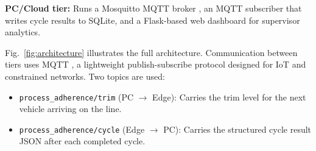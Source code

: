 \documentclass[conference]{IEEEtran}
\begin{document}
\textbf{PC/Cloud tier:} Runs a Mosquitto MQTT broker \cite{b2}, an MQTT subscriber that writes cycle results to SQLite, and a Flask-based \cite{b5} web dashboard for supervisor analytics.

Fig.~\ref{fig:architecture} illustrates the full architecture. Communication between tiers uses MQTT \cite{b7}, a lightweight publish-subscribe protocol designed for IoT and constrained networks. Two topics are used:
\begin{itemize}
    \item \texttt{process\_adherence/trim} (PC $\rightarrow$ Edge): Carries the trim level for the next vehicle arriving on the line.
    \item \texttt{process\_adherence/cycle} (Edge $\rightarrow$ PC): Carries the structured cycle result JSON after each completed cycle.
\end{itemize}
\end{document}
